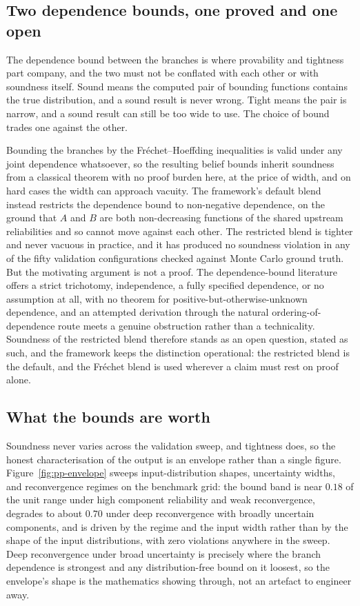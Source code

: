 \documentclass[12pt]{report}
\begin{document}
\subsection{Two dependence bounds, one proved and one open}
\label{sec:pp-pbox-blends}

The dependence bound between the branches is where provability and tightness part company, and the two must not be conflated with each other or with soundness itself. Sound means the computed pair of bounding functions contains the true distribution, and a sound result is never wrong. Tight means the pair is narrow, and a sound result can still be too wide to use. The choice of bound trades one against the other.

Bounding the branches by the Fr\'echet--Hoeffding inequalities is valid under any joint dependence whatsoever, so the resulting belief bounds inherit soundness from a classical theorem \cite{williamson1990probabilistic} with no proof burden here, at the price of width, and on hard cases the width can approach vacuity. The framework's default blend instead restricts the dependence bound to non-negative dependence, on the ground that $A$ and $B$ are both non-decreasing functions of the shared upstream reliabilities and so cannot move against each other. The restricted blend is tighter and never vacuous in practice, and it has produced no soundness violation in any of the fifty validation configurations checked against Monte Carlo ground truth. But the motivating argument is not a proof. The dependence-bound literature offers a strict trichotomy, independence, a fully specified dependence, or no assumption at all, with no theorem for positive-but-otherwise-unknown dependence, and an attempted derivation through the natural ordering-of-dependence route meets a genuine obstruction rather than a technicality. Soundness of the restricted blend therefore stands as an open question, stated as such, and the framework keeps the distinction operational: the restricted blend is the default, and the Fr\'echet blend is used wherever a claim must rest on proof alone.

\subsection{What the bounds are worth}
\label{sec:pp-pbox-value}

Soundness never varies across the validation sweep, and tightness does, so the honest characterisation of the output is an envelope rather than a single figure. Figure~\ref{fig:pp-envelope} sweeps input-distribution shapes, uncertainty widths, and reconvergence regimes on the benchmark grid: the bound band is near $0.18$ of the unit range under high component reliability and weak reconvergence, degrades to about $0.70$ under deep reconvergence with broadly uncertain components, and is driven by the regime and the input width rather than by the shape of the input distributions, with zero violations anywhere in the sweep. Deep reconvergence under broad uncertainty is precisely where the branch dependence is strongest and any distribution-free bound on it loosest, so the envelope's shape is the mathematics showing through, not an artefact to engineer away.
\end{document}
